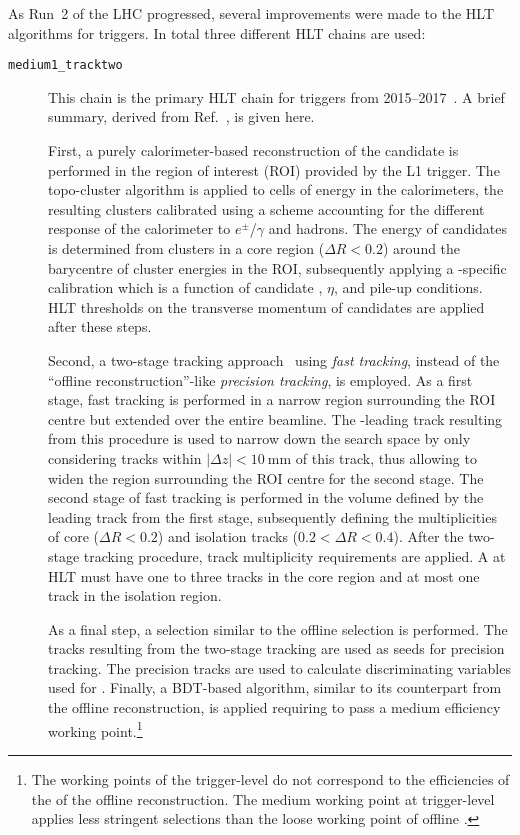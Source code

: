 As Run~2 of the LHC progressed, several improvements were made to the
HLT algorithms for \tauhadvis triggers. In total three different
\tauhadvis HLT chains are used:
\begin{description}

\item[\texttt{medium1\_tracktwo}] This chain is the primary HLT chain
  for \tauhadvis triggers from
  2015--2017~\cite{ATL-DAQ-PUB-2016-001,ATL-DAQ-PUB-2017-001,ATL-DAQ-PUB-2018-002}. A
  brief summary, derived from Ref.~\cite{ATLAS-CONF-2017-061}, is
  given here.

  First, a purely calorimeter-based reconstruction of the \tauhadvis
  candidate is performed in the region of interest (ROI) provided by
  the L1 trigger. The topo-cluster algorithm is applied to cells of
  energy in the calorimeters, the resulting clusters calibrated using
  a scheme accounting for the different response of the calorimeter to
  $e^\pm$/$\gamma$ and hadrons. The energy of \tauhadvis candidates is
  determined from clusters in a core region ($\Delta R < 0.2$) around
  the barycentre of cluster energies in the ROI, subsequently applying
  a \tauhadvis-specific calibration which is a function of \tauhadvis
  candidate \pT, $\eta$, and pile-up conditions. HLT thresholds on the
  transverse momentum of \tauhadvis candidates are applied after these
  steps.

  Second, a two-stage tracking approach~\cite{TRIG-2016-01} using
  \emph{fast tracking}, instead of the ``offline reconstruction''-like
  \emph{precision tracking}, is employed. As a first stage, fast
  tracking is performed in a narrow region surrounding the \tauhadvis
  ROI centre but extended over the entire beamline. The \pT-leading
  track resulting from this procedure is used to narrow down the
  search space by only considering tracks within
  $|\Delta z| < \SI{10}{\milli\metre}$ of this track, thus allowing to
  widen the region surrounding the ROI centre for the second
  stage. The second stage of fast tracking is performed in the volume
  defined by the leading track from the first stage, subsequently
  defining the multiplicities of core ($\Delta R < 0.2$) and isolation
  tracks ($0.2 < \Delta R < 0.4$). After the two-stage tracking
  procedure, track multiplicity requirements are applied. A \tauhadvis
  at HLT must have one to three tracks in the core region and at most
  one track in the isolation region.

  As a final step, a \tauhadvis selection similar to the offline
  \tauhadvis selection is performed. The tracks resulting from the
  two-stage tracking are used as seeds for precision tracking. The
  precision tracks are used to calculate discriminating variables used
  for \tauid. Finally, a BDT-based \tauid algorithm, similar to its
  counterpart from the offline \tauhadvis reconstruction, is applied
  requiring \tauhadvis to pass a medium efficiency working
  point.\footnote{The working points of the trigger-level \tauid do
    not correspond to the efficiencies of the \tauid of the offline
    reconstruction. The medium working point at trigger-level applies
    less stringent selections than the loose working point of offline
    \tauid.}


\end{description}
